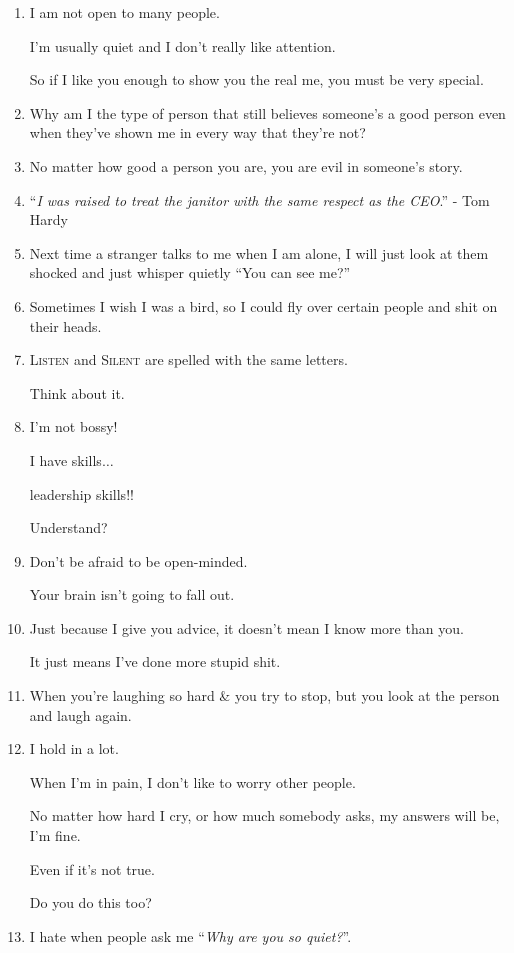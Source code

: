 \documentclass{article}
\numberwithin{equation}{section}
\begin{document}
\begin{enumerate}
    Not adding unnecessary stress to each others lives.
    \item I am not open to many people.
    
    I'm usually quiet and I don't really like attention.
    
    So if I like you enough to show you the real me, you must be very special.
    \item Why am I the type of person that still believes someone's a good person even when they've shown me in every way that they're not?
    \item No matter how good a person you are, you are evil in someone's story.
    \item ``\textit{I was raised to treat the janitor with the same respect as the CEO}.'' - Tom Hardy
    \item Next time a stranger talks to me when I am alone, I will just look at them shocked and just whisper quietly ``You can see me?''
    \item Sometimes I wish I was a bird, so I could fly over certain people and shit on their heads.
    \item \textsc{Listen} and \textsc{Silent} are spelled with the same letters.
    
    Think about it.
    \item I'm not bossy!
    
    I have skills$\ldots$
    
    leadership skills!!
    
    Understand?
    \item Don't be afraid to be open-minded.
    
    Your brain isn't going to fall out.
    \item Just because I give you advice, it doesn't mean I know more than you.
    
    It just means I've done more stupid shit.
    \item When you're laughing so hard \& you try to stop, but you look at the person and laugh again.
    \item I hold in a lot.
    
    When I'm in pain, I don't like to worry other people.
    
    No matter how hard I cry, or how much somebody asks, my answers will be, I'm fine.
    
    Even if it's not true.
    
    Do you do this too?
    \item I hate when people ask me ``\textit{Why are you so quiet?}''.
    

\end{enumerate}
\end{document}
